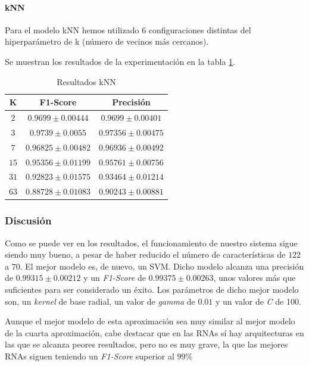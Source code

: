 \documentclass[12pt]{article}
\begin{document}
\paragraph{kNN}
Para el modelo kNN hemos utilizado 6 configuraciones distintas del hiperparámetro de k (número de vecinos más cercanos).

Se muestran los resultados de la experimentación en la tabla \ref{Tab:kNN_5}.

\begin{table}[!ht]
	\caption{Resultados kNN}
	\centering
		\begin{tabular}{||c c c||}
			\hline 
			K & F1-Score & Precisión \\ [0.5ex]  
			\hline\hline
			$2$ & $0.9699 \pm 0.00444$ & $0.9699 \pm 0.00401$ \\
			\hline 
			$3$ & $0.9739 \pm 0.0055$ & $0.97356 \pm 0.00475$ \\
			\hline 
			$7$ & $0.96825 \pm 0.00482$ & $0.96936 \pm 0.00492$ \\
			\hline 
			$15$ & $0.95356 \pm 0.01199$ & $0.95761 \pm 0.00756$ \\
			\hline 
			$31$ & $0.92823 \pm 0.01575$ & $0.93464 \pm 0.01214$ \\
			\hline 
			$63$ & $0.88728 \pm 0.01083$ & $0.90243 \pm 0.00881$ \\
			\hline
		\end{tabular}
	\label{Tab:kNN_5}
\end{table}

\subsubsection{Discusión}

Como se puede ver en los resultados, el funcionamiento de nuestro sistema sigue siendo
muy bueno, a pesar de haber reducido el número de  características de $122$ a $70$. 
El mejor modelo es, de nuevo, un SVM. Dicho modelo alcanza una precisión
de $0.99315 \pm 0.00212$ y un \textit{F1-Score} de $0.99375 \pm 0.00263$,
unos valores más que suficientes para ser considerado un éxito. 
Los parámetros de dicho mejor modelo son, un \textit{kernel} de base radial,
un valor de \textit{gamma} de $0.01$ y un valor de \textit{C} de 100.

\bigskip
Aunque el mejor modelo de esta aproximación sea muy similar al mejor
modelo de la cuarta aproximación, cabe destacar que en las RNAs sí hay
arquitecturas en las que se alcanza peores resultados, pero no es muy grave,
la que las mejores RNAs siguen teniendo un \textit{F1-Score} superior al $99\%$
\end{document}
